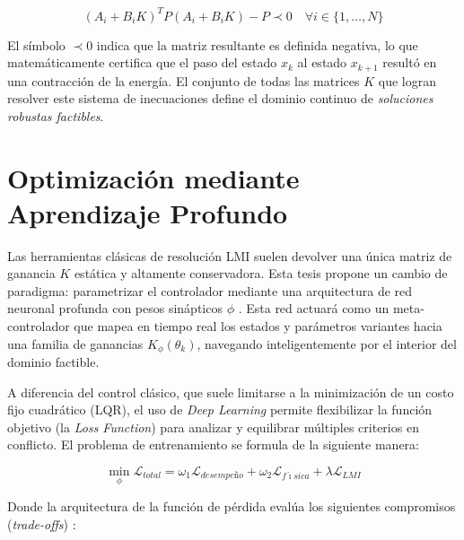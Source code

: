 \documentclass[12pt,twoside]{report}
\begin{document}
\begin{equation}
    (A_i + B_i K)^T P (A_i + B_i K) - P \prec 0 \quad \forall i \in \{1, \dots, N\}
    \label{eq:lmi_condition}
\end{equation}

El símbolo $\prec 0$ indica que la matriz resultante es definida negativa, lo que matemáticamente certifica que el paso del estado $x_k$ al estado $x_{k+1}$ resultó en una contracción de la energía. El conjunto de todas las matrices $K$ que logran resolver este sistema de inecuaciones define el dominio continuo de \textit{soluciones robustas factibles}.

\section{Optimización mediante Aprendizaje Profundo}

Las herramientas clásicas de resolución LMI suelen devolver una única matriz de ganancia $K$ estática y altamente conservadora. Esta tesis propone un cambio de paradigma: parametrizar el controlador mediante una arquitectura de red neuronal profunda con pesos sinápticos $\phi$ \cite{amos2017}. Esta red actuará como un meta-controlador que mapea en tiempo real los estados y parámetros variantes hacia una familia de ganancias $K_\phi(\theta_k)$, navegando inteligentemente por el interior del dominio factible.

A diferencia del control clásico, que suele limitarse a la minimización de un costo fijo cuadrático (LQR), el uso de \textit{Deep Learning} permite flexibilizar la función objetivo (la \textit{Loss Function}) para analizar y equilibrar múltiples criterios en conflicto. El problema de entrenamiento se formula de la siguiente manera:

\begin{equation}
    \min_{\phi} \mathcal{L}_{total} = \omega_1 \mathcal{L}_{desempeño} + \omega_2 \mathcal{L}_{f\acute{\imath}sica} + \lambda \mathcal{L}_{LMI}
    \label{eq:optim_obj}
\end{equation}

Donde la arquitectura de la función de pérdida evalúa los siguientes compromisos (\textit{trade-offs}) \cite{manek2019}:
\end{document}
